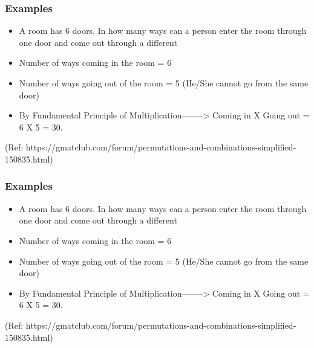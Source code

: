 \begin{frame}[fragile]\frametitle{Examples}
\begin{itemize}
\item A room has 6 doors. In how many ways can a person enter the room through one door and come out through a different
 
\item Number of ways coming in the room = 6
 
\item Number of ways going out of the room = 5 (He/She cannot go from the same door)
 
\item By Fundamental Principle of Multiplication--------> Coming in X Going out = 6 X 5 = 30.
 \end{itemize}
 
 (Ref: https://gmatclub.com/forum/permutations-and-combinations-simplified-150835.html)
\end{frame}

\begin{frame}[fragile]\frametitle{Examples}
\begin{itemize}
\item A room has 6 doors. In how many ways can a person enter the room through one door and come out through a different
 
\item Number of ways coming in the room = 6
 
\item Number of ways going out of the room = 5 (He/She cannot go from the same door)
 
\item By Fundamental Principle of Multiplication--------> Coming in X Going out = 6 X 5 = 30.
 \end{itemize}
 
 (Ref: https://gmatclub.com/forum/permutations-and-combinations-simplified-150835.html)
\end{frame}


